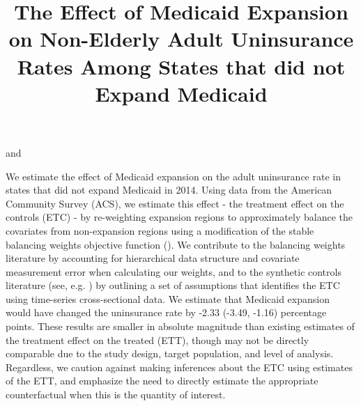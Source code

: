 \documentclass[aoas]{imsart}
\theoremstyle{plain}
\theoremstyle{remark}
\begin{document}
\begin{frontmatter}
\title{The Effect of Medicaid Expansion on Non-Elderly Adult Uninsurance Rates Among States that did not Expand Medicaid}

\begin{aug}
\author[A]{ } and
\author[A]{ }
\address[A]{Carnegie Mellon University, Heinz College and Department of Statistics and Data Science }

\end{aug}

\begin{flushleft}
We estimate the effect of Medicaid expansion on the adult uninsurance rate in states that did not expand Medicaid in 2014. Using data from the American Community Survey (ACS), we estimate this effect - the treatment effect on the controls (ETC) - by re-weighting expansion regions to approximately balance the covariates from non-expansion regions using a modification of the stable balancing weights objective function (\cite{zubizarreta2015stable}). We contribute to the balancing weights literature by accounting for hierarchical data structure and covariate measurement error when calculating our weights, and to the synthetic controls literature (see, e.g. \cite{abadie2010synthetic}) by outlining a set of assumptions that identifies the ETC using time-series cross-sectional data. We estimate that Medicaid expansion would have changed the uninsurance rate by -2.33 (-3.49, -1.16) percentage points. These results are smaller in absolute magnitude than existing estimates of the treatment effect on the treated (ETT), though may not be directly comparable due to the study design, target population, and level of analysis. Regardless, we caution against making inferences about the ETC using estimates of the ETT, and emphasize the need to directly estimate the appropriate counterfactual when this is the quantity of interest.
\end{flushleft}


\begin{keyword}
\end{keyword}

\end{frontmatter}
\end{document}

